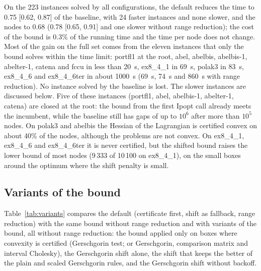 \documentclass[11pt]{article}
\begin{document}
On the 223 instances solved by all configurations, the default reduces the time to
0.75 [0.62, 0.87] of the baseline, with 24 faster instances and none slower, and the
nodes to 0.68 (0.78 [0.65, 0.91] and one slower without range reduction); the cost of
the bound is 0.3\% of the running time and the time per node does not change. Most of the gain on the full set comes from the eleven instances that only
the bound solves within the time limit: portfl1 at the root, abel, abelbis, abelbis-1,
abelter-1, catena and fccu in less than 20~s, ex8\_4\_1 in 69~s, polak3 in 83~s,
ex8\_4\_6 and ex8\_4\_6ter in about 1000~s (69~s, 74~s and 860~s with range
reduction). No instance solved by the baseline is lost. The slower instances are
discussed below. Five of these instances (portfl1,
abel, abelbis-1, abelter-1, catena) are closed at the root: the bound from the first
Ipopt call already meets the incumbent, while the baseline still has gaps of up to
$10^6$ after more than $10^5$ nodes. On polak3 and abelbis the Hessian of the Lagrangian
is certified convex on about 40\% of the nodes, although the problems are not convex.
On ex8\_4\_1, ex8\_4\_6 and ex8\_4\_6ter it is never certified, but the shifted bound
raises the lower bound of most nodes (9\,333 of 10\,100 on ex8\_4\_1), on the small boxes
around the optimum where the shift penalty is small.

\subsection{Variants of the bound}

Table~\ref{tab:variants} compares the default (certificate first, shift as fallback,
range reduction) with the same bound without range reduction and with variants of the
bound, all without range reduction: the bound applied only on boxes where convexity is
certified (Gerschgorin test; or Gerschgorin, comparison matrix and interval Cholesky),
the Gerschgorin shift alone, the shift that keeps the better of the plain and scaled
Gerschgorin rules, and the Gerschgorin shift without backoff.
\end{document}
